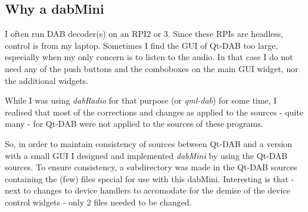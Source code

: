 \documentclass[12pt]{article}
\begin{document}
\subsection{Why a dabMini}
I often run DAB decoder(s) on an RPI2 or 3. Since these RPIs are headless,
control is from my laptop.
Sometimes I find the GUI of Qt-DAB too large, especially when my only concern
is to listen to the audio. In that case I do not need any of the push buttons
and the comboboxes on the main GUI widget, nor the additional widgets.
\par
While I was using {\em dabRadio} for that purpose (or {\em qml-dab})
for some time, I realised that most of the corrections and changes
as applied to the sources - quite many - for Qt-DAB were not applied to
the sources of these programs.
\par
So, in order to maintain consistency of sources between Qt-DAB and a
version with a small GUI I designed and implemented {\em dabMini}
by using the Qt-DAB sources. To ensure 
consistency, a subdirectory was made in the Qt-DAB sources containing
the (few) files special for use with this dabMini. Interesting is
that - next to changes to device handlers to accomodate for the demise
of the device control widgets - only 2 files needed to be changed.
\end{document}
